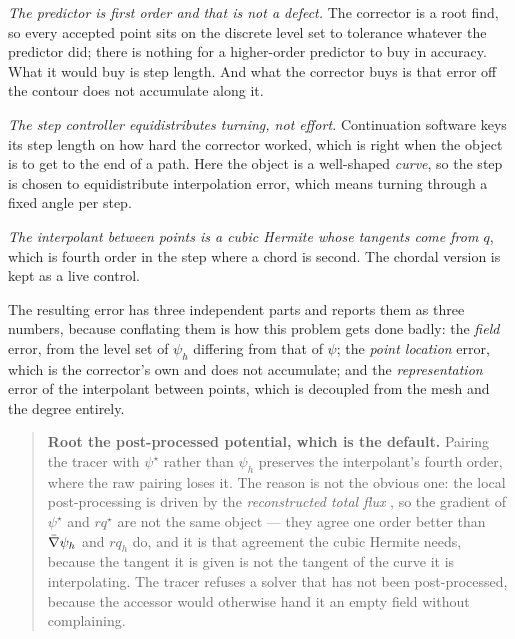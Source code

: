 \emph{The predictor is first order and that is not a defect.} The corrector is a
root find, so every accepted point sits on the discrete level set to tolerance
whatever the predictor did; there is nothing for a higher-order predictor to buy
in accuracy. What it would buy is step length. And what the corrector buys is
that error off the contour does not accumulate along it.

\emph{The step controller equidistributes turning, not effort.} Continuation
software keys its step length on how hard the corrector worked, which is right
when the object is to get to the end of a path. Here the object is a well-shaped
\emph{curve}, so the step is chosen to equidistribute interpolation error, which
means turning through a fixed angle per step.

\emph{The interpolant between points is a cubic Hermite whose tangents come from
$q$}, which is fourth order in the step where a chord is second. The chordal
version is kept as a live control.

The resulting error has three independent parts and {\meq} reports them as three
numbers, because conflating them is how this problem gets done badly: the
\emph{field} error, from the level set of $\psi_h$ differing from that of $\psi$;
the \emph{point location} error, which is the corrector's own and does not
accumulate; and the \emph{representation} error of the interpolant between
points, which is decoupled from the mesh and the degree entirely.

\begin{quote}
	\textbf{Root the post-processed potential, which is the default.} Pairing the
	tracer with $\psi^{\star}$ rather than $\psi_h$ preserves the interpolant's
	fourth order, where the raw pairing loses it. The reason is not the obvious
	one: the local post-processing is driven by the \emph{reconstructed total
	flux} \cite{Stenberg1991}, so the gradient of $\psi^{\star}$ and $rq^{\star}$
	are not the same object --- they agree one order better than $\bar{\nabla}\psi_h$
	and $rq_h$ do, and it is that agreement the cubic Hermite needs, because the
	tangent it is given is not the tangent of the curve it is interpolating. The
	tracer refuses a solver that has not been post-processed, because the
	accessor would otherwise hand it an empty field without complaining.
\end{quote}

